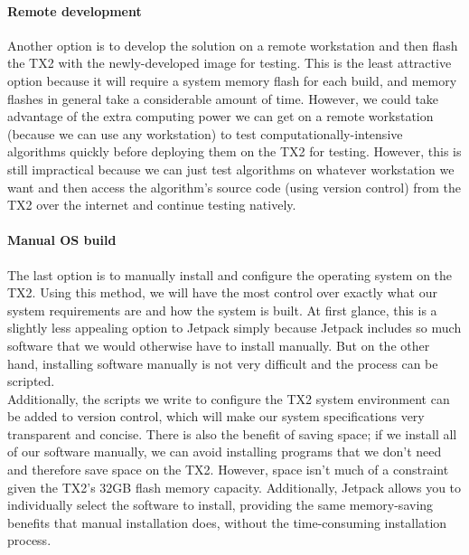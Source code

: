 \paragraph{Remote development}
Another option is to develop the solution on a remote workstation and then flash the TX2 with the newly-developed image for testing. This is the least attractive option because it will require a system memory flash for each build, and memory flashes in general take a considerable amount of time. However, we could take advantage of the extra computing power we can get on a remote workstation (because we can use any workstation) to test computationally-intensive algorithms quickly before deploying them on the TX2 for testing. However, this is still impractical because we can just test algorithms on whatever workstation we want and then access the algorithm's source code (using version control) from the TX2 over the internet and continue testing natively.

\paragraph{Manual OS build}
The last option is to manually install and configure the operating system on the TX2. Using this method, we will have the most control over exactly what our system requirements are and how the system is built. At first glance, this is a slightly less appealing option to Jetpack simply because Jetpack includes so much software that we would otherwise have to install manually. But on the other hand, installing software manually is not very difficult and the process can be scripted. \\

Additionally, the scripts we write to configure the TX2 system environment can be added to version control, which will make our system specifications very transparent and concise. There is also the benefit of saving space; if we install all of our software manually, we can avoid installing programs that we don't need and therefore save space on the TX2. However, space isn't much of a constraint given the TX2's 32GB flash memory capacity. Additionally, Jetpack allows you to individually select the software to install, providing the same memory-saving benefits that manual installation does, without the time-consuming installation process.


